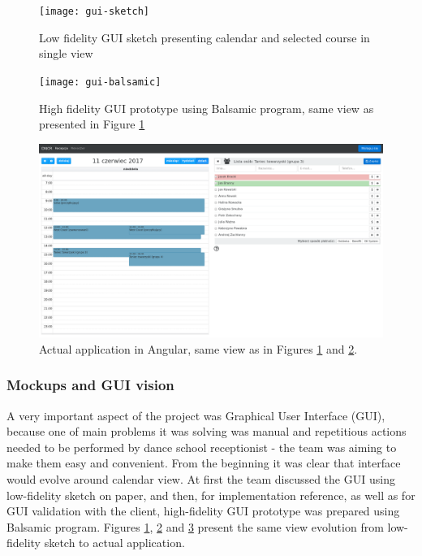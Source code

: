 \documentclass{article}
\begin{document}
\begin{figure}[h]
    \texttt{[image: gui-sketch]}
    \caption{Low fidelity GUI sketch presenting calendar and selected course in single view}
    \label{fig:gui-sketch}
\end{figure}
\begin{figure}[h]
    \texttt{[image: gui-balsamic]}
    \caption{High fidelity GUI prototype using Balsamic program, same view as presented in Figure \ref{fig:gui-sketch}}
    \label{fig:gui-balsamic}
\end{figure}
\begin{figure}[h]
    \includegraphics[width=\textwidth]{gui-angular}
    \caption{Actual application in Angular, same view as in Figures \ref{fig:gui-sketch} and \ref{fig:gui-balsamic}.} 
    \label{fig:gui-angular}
\end{figure}

\subsubsection{Mockups and GUI vision}
A very important aspect of the project was Graphical User Interface (GUI), because one of main problems it was solving was manual and repetitious actions needed to be performed by dance school receptionist - the team was aiming to make them easy and convenient. From the beginning it was clear that interface would evolve around calendar view. At first the team discussed the GUI using low-fidelity sketch on paper, and then, for implementation reference, as well as for GUI validation with the client, high-fidelity GUI prototype was prepared using Balsamic program. Figures \ref{fig:gui-sketch}, \ref{fig:gui-balsamic} and \ref{fig:gui-angular} present the same view evolution from low-fidelity sketch to actual application.
\end{document}
